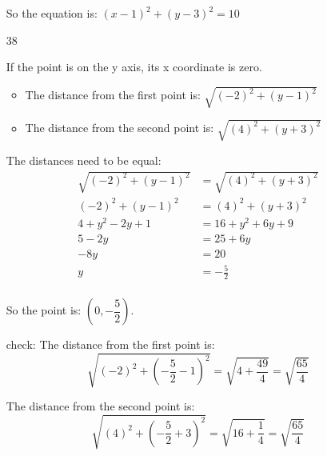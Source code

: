 \documentclass[fleqn,addpoints]{exam}
\begin{document}
\begin{itemize}
So the equation is: $(x-1)^2+(y-3)^2 = 10$

\item[38]

If the point is on the y axis, its x coordinate is zero.

\begin{itemize}
  \item The distance from the first point is: $\sqrt{(-2)^2 + (y-1)^2}$
  \item The distance from the second point is: $\sqrt{(4)^2 + (y+3)^2}$
\end{itemize}

The distances need to be equal:
\begin{align*}
  \sqrt{(-2)^2 + (y-1)^2} &= \sqrt{(4)^2 + (y+3)^2} \\
  (-2)^2 + (y-1)^2 &= (4)^2 + (y+3)^2 \\
  4 + y^2 - 2y + 1 &= 16 + y^2 + 6y + 9 \\
  5  - 2y &= 25 + 6y  \\
    -8y &= 20  \\
    y &= -\frac{5}{2}  \\
\end{align*}

So the point is: $(0, -\dfrac{5}{2})$.

check:
  The distance from the first point is: 
\[
  \sqrt{(-2)^2 + (-\dfrac{5}{2}-1)^2} = \sqrt{4 + \dfrac{49}{4}} = \sqrt{\dfrac{65}{4}}
\]

The distance from the second point is: 
\[
  \sqrt{(4)^2 + (-\dfrac{5}{2}+3)^2} = \sqrt{16 + \dfrac{1}{4}} = \sqrt{\dfrac{65}{4}}
\]

\end{itemize}

\fi
\end{document}

